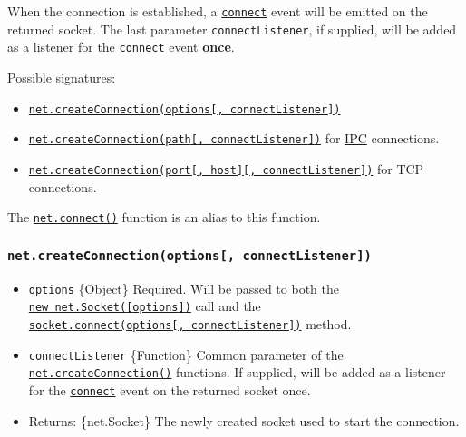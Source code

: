 When the connection is established, a
\hyperref[event-connect]{\texttt{\textquotesingle{}connect\textquotesingle{}}}
event will be emitted on the returned socket. The last parameter
\texttt{connectListener}, if supplied, will be added as a listener for
the
\hyperref[event-connect]{\texttt{\textquotesingle{}connect\textquotesingle{}}}
event \textbf{once}.

Possible signatures:

\begin{itemize}
\tightlist
\item
  \hyperref[netcreateconnectionoptions-connectlistener]{\texttt{net.createConnection(options{[},\ connectListener{]})}}
\item
  \hyperref[netcreateconnectionpath-connectlistener]{\texttt{net.createConnection(path{[},\ connectListener{]})}}
  for \hyperref[ipc-support]{IPC} connections.
\item
  \hyperref[netcreateconnectionport-host-connectlistener]{\texttt{net.createConnection(port{[},\ host{]}{[},\ connectListener{]})}}
  for TCP connections.
\end{itemize}

The \hyperref[netconnect]{\texttt{net.connect()}} function is an alias
to this function.

\subsubsection{\texorpdfstring{\texttt{net.createConnection(options{[},\ connectListener{]})}}{net.createConnection(options{[}, connectListener{]})}}\label{net.createconnectionoptions-connectlistener}

\begin{itemize}
\tightlist
\item
  \texttt{options} \{Object\} Required. Will be passed to both the
  \hyperref[new-netsocketoptions]{\texttt{new\ net.Socket({[}options{]})}}
  call and the
  \hyperref[socketconnectoptions-connectlistener]{\texttt{socket.connect(options{[},\ connectListener{]})}}
  method.
\item
  \texttt{connectListener} \{Function\} Common parameter of the
  \hyperref[netcreateconnection]{\texttt{net.createConnection()}}
  functions. If supplied, will be added as a listener for the
  \hyperref[event-connect]{\texttt{\textquotesingle{}connect\textquotesingle{}}}
  event on the returned socket once.
\item
  Returns: \{net.Socket\} The newly created socket used to start the
  connection.
\end{itemize}

